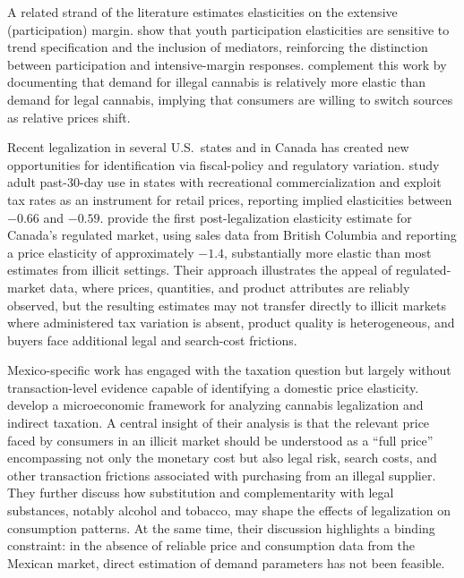 A related strand of the literature estimates elasticities on the extensive (participation) margin.  \citet{pacula2000youth} show that youth participation elasticities are sensitive to trend specification and the inclusion of mediators, reinforcing the distinction between participation and intensive-margin responses.  \citet{amlung2019substitution} complement this work by documenting that demand for illegal cannabis is relatively more elastic than demand for legal cannabis, implying that consumers are willing to switch sources as relative prices shift.

Recent legalization in several U.S.\ states and in Canada has created new opportunities for identification via fiscal-policy and regulatory variation.  \citet{han2025commercialization} study adult past-30-day use in states with recreational commercialization and exploit tax rates as an instrument for retail prices, reporting implied elasticities between $-0.66$ and $-0.59$.  \citet{dodd2025canada} provide the first post-legalization elasticity estimate for Canada's regulated market, using sales data from British Columbia and reporting a price elasticity of approximately $-1.4$, substantially more elastic than most estimates from illicit settings.  Their approach illustrates the appeal of regulated-market data, where prices, quantities, and product attributes are reliably observed, but the resulting estimates may not transfer directly to illicit markets where administered tax variation is absent, product quality is heterogeneous, and buyers face additional legal and search-cost frictions.

Mexico-specific work has engaged with the taxation question but largely without transaction-level evidence capable of identifying a domestic price elasticity.  \citet{perezromero2014elementos} develop a microeconomic framework for analyzing cannabis legalization and indirect taxation.  A central insight of their analysis is that the relevant price faced by consumers in an illicit market should be understood as a ``full price'' encompassing not only the monetary cost but also legal risk, search costs, and other transaction frictions associated with purchasing from an illegal supplier.  They further discuss how substitution and complementarity with legal substances, notably alcohol and tobacco, may shape the effects of legalization on consumption patterns.  At the same time, their discussion highlights a binding constraint: in the absence of reliable price and consumption data from the Mexican market, direct estimation of demand parameters has not been feasible.

